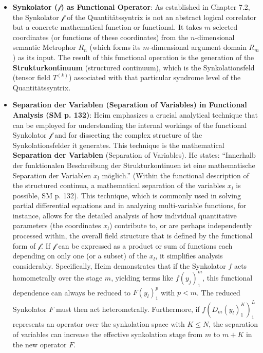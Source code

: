 \documentclass[12pt]{article}
\newcommand{\q}[1]{\enquote{#1}}
\newcommand{\synkolationsstufe}{m}
\newcommand{\semantischermetrophor}{R_n}
\newcommand{\funktionaloperator}{\mathcal{f}}
\begin{document}
\begin{itemize}
    \item \textbf{Synkolator (\(\funktionaloperator\)) as Functional Operator}: As established in Chapter 7.2, the Synkolator \( \funktionaloperator \) of the Quantitätssyntrix is not an abstract logical correlator but a concrete mathematical function or functional. It takes \( \synkolationsstufe \) selected coordinates (or functions of these coordinates) from the \( n \)-dimensional semantic Metrophor \( \semantischermetrophor \) (which forms its \( \synkolationsstufe \)-dimensional argument domain \( R_m \)) as its input. The result of this functional operation is the generation of the \textbf{Strukturkontinuum} (structured continuum), which is the Synkolationsfeld (tensor field \(T^{(k)}\)) associated with that particular syndrome level of the Quantitätssyntrix.
    \item \textbf{Separation der Variablen (Separation of Variables) in Functional Analysis (SM p. 132)}:
    Heim emphasizes a crucial analytical technique that can be employed for understanding the internal workings of the functional Synkolator \( \funktionaloperator \) and for dissecting the complex structure of the Synkolationsfelder it generates. This technique is the mathematical \textbf{Separation der Variablen} (Separation of Variables). He states: \q{Innerhalb der funktionalen Beschreibung der Strukturkontinuen ist eine mathematische Separation der Variablen \( x_l \) möglich.} (Within the functional description of the structured continua, a mathematical separation of the variables \( x_l \) is possible, SM p. 132). This technique, which is commonly used in solving partial differential equations and in analyzing multi-variable functions, for instance, allows for the detailed analysis of how individual quantitative parameters (the coordinates \( x_l \)) contribute to, or are perhaps independently processed within, the overall field structure that is defined by the functional form of \( \funktionaloperator \). If \( \funktionaloperator \) can be expressed as a product or sum of functions each depending on only one (or a subset) of the \(x_l\), it simplifies analysis considerably. Specifically, Heim demonstrates that if the Synkolator $f$ acts homometrally over the stage $m$, yielding terms like $f(y_j)_1^m$, this functional dependence can always be reduced to $F(y_l)_1^p$ with $p < m$. The reduced Synkolator $F$ must then act heterometrally. Furthermore, if $f(D_m(y_l)_1^K)_1^L$ represents an operator over the synkolation space with $K \le N$, the separation of variables can increase the effective synkolation stage from $m$ to $m + K$ in the new operator $F$.

\end{itemize}
\end{document}
